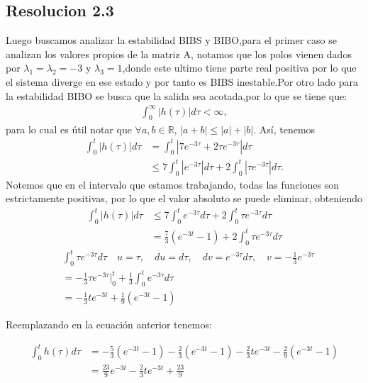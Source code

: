 \documentclass[
  11pt,
  letterpaper,
   addpoints,
  answers
  ]{exam}
\begin{document}
\begin{questions}
\begin{solution}
\subsection*{Resolucion 2.3}
Luego buscamos analizar la estabilidad BIBS y BIBO,para el primer caso se analizan los valores propios de la matriz A, notamos que los polos vienen dados por $\lambda_{1}=\lambda_{2}=-3$ y $\lambda_{3}=1$,donde este ultimo tiene parte real positiva por lo que el sistema diverge en ese estado y por tanto es BIBS inestable.Por otro lado para la estabilidad BIBO se busca que la salida sea acotada,por lo que se tiene que:
\begin{align}
    \int_0^\infty |h(\tau)| d\tau < \infty,
    \end{align}
    para lo cual es útil notar que $\forall a,b \in \mathbb{R}$, $|a + b| \leq |a| + |b|$. Así, tenemos
    \begin{align}
    \int_0^t |h(\tau)| d\tau &= \int_0^t |7e^{-3\tau} + 2\tau e^{-3\tau}| d\tau \\
    &\leq 7 \int_0^t |e^{-3\tau}| d\tau + 2 \int_0^t |\tau e^{-3\tau}| d\tau.
    \end{align}
    Notemos que en el intervalo que estamos trabajando, todas las funciones son estrictamente positivas, por lo que el valor absoluto se puede eliminar, obteniendo
    \begin{align}
    \int_0^t |h(\tau)| d\tau &\leq 7 \int_0^t e^{-3\tau} d\tau + 2 \int_0^t \tau e^{-3\tau} d\tau \\
    &=  \frac{7}{3} (e^{-3t} - 1) + 2 \int_0^t \tau e^{-3\tau} d\tau
    \end{align}
\begin{align}
    &\int_0^t \tau e^{-3\tau} d\tau \quad u = \tau, \quad du = d\tau, \quad dv = e^{-3\tau} d\tau, \quad v = -\frac{1}{3} e^{-3\tau} \\
    &= -\frac{1}{3} \tau e^{-3\tau} \Big|_0^t + \frac{1}{3} \int_0^t e^{-3\tau} d\tau \\
      &= -\frac{1}{3} t e^{-3t} + \frac{1}{9} \left( e^{-3t} - 1 \right)
    \end{align}
    
    Reemplazando en la ecuación anterior tenemos:

    \begin{align}
        \int_0^t h(\tau) d\tau &= - \frac{5}{3} \left( e^{-3t} - 1 \right) - \frac{2}{3} \left( e^{-3t} - 1 \right) - \frac{2}{3} t e^{-3t} - \frac{2}{9} \left( e^{-3t} - 1 \right) \\
        &= \frac{23}{9} e^{-3t} - \frac{2}{3} t e^{-3t} + \frac{23}{9}
    \end{align}
        

\end{solution}
\end{questions}
\end{document}
